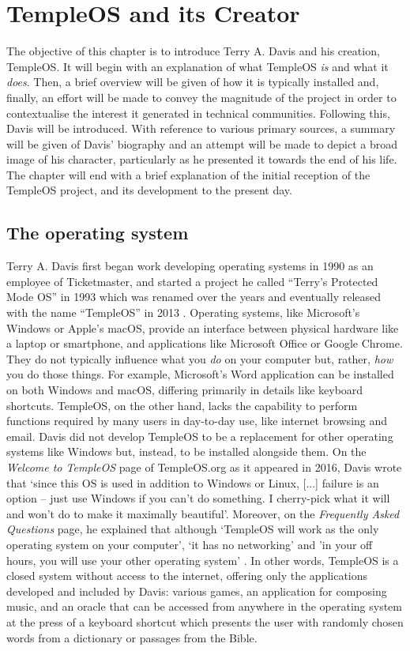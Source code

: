 \documentclass[Draft.tex]{subfiles}
\begin{document}
\chapter{TempleOS and its Creator}

The objective of this chapter is to introduce Terry A. Davis
and his creation, TempleOS.
It will begin with an explanation of what TempleOS \textit{is}
and what it \textit{does}.
Then, a brief overview will be given of how it is typically installed
and, finally, an effort will be made to convey
the magnitude of the project in order to contextualise
the interest it generated in technical communities.
Following this, Davis will be introduced.
With reference to various primary sources,
a summary will be given of Davis' biography and
an attempt will be made to depict a broad image of his character,
particularly as he presented it towards the end of his life.
The chapter will end with a brief explanation of the initial reception of
the TempleOS project, and its development to the present day.

\section*{The operating system}

Terry A. Davis first began work developing operating systems in 1990
as an employee of Ticketmaster, and started a project he called
``Terry's Protected Mode OS'' in 1993 which was renamed over the years
and eventually released with the name ``TempleOS'' in 2013
\parencite{History}.
Operating systems, like Microsoft's Windows or Apple's macOS,
provide an interface between physical hardware like a laptop or smartphone,
and applications like Microsoft Office or Google Chrome.
They do not typically influence what you \textit{do}
on your computer but, rather, \textit{how} you do those things.
For example, Microsoft's Word application can be installed on both
Windows and macOS, differing primarily in details like keyboard shortcuts.
TempleOS, on the other hand, lacks the capability to perform functions
required by many users in day-to-day use, like internet browsing and email.
Davis did not develop TempleOS to be a replacement for other operating systems
like Windows but, instead, to be installed alongside them.
On the \textit{Welcome to TempleOS} page of TempleOS.org
as it appeared in 2016\footnotemark, Davis \parencite*{Welcome} wrote that
`since this OS is used in addition to Windows or Linux,
[...] failure is an option -- just use Windows if you can't do something.
I cherry-pick what it will and won't do to make it maximally beautiful'.
Moreover, on the \textit{Frequently Asked Questions} page, he explained that
although `TempleOS will work as the only operating system on your computer',
`it has no networking' and 'in your off hours,
you will use your other operating system' \parencite{FAQ}.
In other words, TempleOS is a closed system without access to the internet,
offering only the applications developed and included by Davis:
various games, an application for composing music,
and an oracle that can be accessed from anywhere in the operating system
at the press of a keyboard shortcut which presents the user with randomly
chosen words from a dictionary or passages from the Bible.
\end{document}
